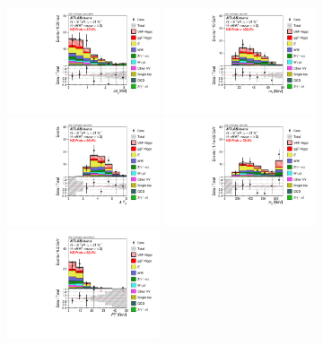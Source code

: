 \begin{figure}[p!]
  \centering
   \includegraphics[width=0.4\textwidth]{fig/analysis/BDTinputVarsInSR/DF_SR_FitRegion_DPhill_mh125_lin.pdf}
   \includegraphics[width=0.4\textwidth]{fig/analysis/BDTinputVarsInSR/DF_SR_FitRegion_Mll_mh125_lin.pdf}
   \includegraphics[width=0.4\textwidth]{fig/analysis/BDTinputVarsInSR/DF_SR_FitRegion_DYjj_mh125_lin.pdf}
   \includegraphics[width=0.4\textwidth]{fig/analysis/BDTinputVarsInSR/DF_SR_FitRegion_Mjj_mh125_lin.pdf}
   \includegraphics[width=0.4\textwidth]{fig/analysis/BDTinputVarsInSR/DF_SR_FitRegion_Pttot_tr_mh125_lin.pdf}

\end{figure}

